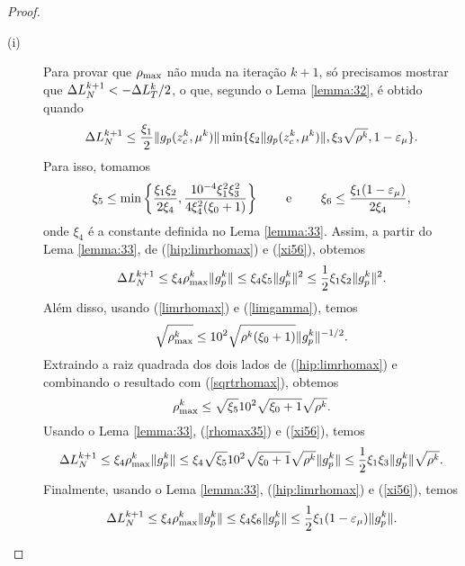 \begin{proof} 
  \begin{description} 
    \item[(i)] Para provar que $\rho_{\max}$ n\~ao muda na itera\c{c}\~ao $k+1$,
      s\'o precisamos mostrar que $\Delta L_N^{k+1} < -\Delta L_T^{k}/2$, o que, segundo o
      Lema \ref{lemma:32}, é obtido quando
  \begin{equation} 
    \DLV{k+1} \leq
    \frac{\xi_1}{2}\norma{g_p(\zc{k},\mu^k)}\min\{\xi_2\norma{g_p(\zc{k},
    \mu^k)},\xi_3\sqrt{\rho^k},1-\epsmu\}.\visiblelbl{eq:DLVlema2}
\end{equation} 
Para isso, tomamos 
\begin{equation} \visiblelbl{xi56}
  \xi_5\leq\min\bigg\{\frac{\xi_1\xi_2}{2\xi_4},\frac{10^{-4}\xi_1^2\xi_3^2}
  {4\xi_4^2(\xi_0+1)}\bigg\} \qquad \mbox{ e } \qquad \xi_6 \leq
  \frac{\xi_1(1-\epsmu)} {2\xi_4}, 
\end{equation} 
onde $\xi_4$ é a constante definida no Lema \ref{lemma:33}. Assim, a partir do Lema
\ref{lemma:33}, de (\ref{hip:limrhomax}) e (\ref{xi56}), obtemos
\begin{equation}\visiblelbl{dlvaux1} 
  \DLV{k+1} \leq \xi_4\rhomax^k\norma{\gpk{k}} \leq
    \xi_4\xi_5\norma{\gpk{k}}^2 \leq \meio\xi_1\xi_2\norma{\gpk{k}}^2.  
\end{equation} 
Além disso, usando (\ref{limrhomax}) e (\ref{limgamma}), temos
\begin{equation}\visiblelbl{sqrtrhomax} 
  \sqrt{\rhomax^k} \leq 10^2\sqrt{\rho^k(\xi_0+1)} \norma{\gpk{k}}^{-1/2}.  
\end{equation}
Extraindo a raiz quadrada dos dois lados de (\ref{hip:limrhomax}) e combinando o
resultado com (\ref{sqrtrhomax}), obtemos
\begin{equation}\visiblelbl{rhomax35} 
  \rhomax^k \leq \sqrt{\xi_5}10^2\sqrt{\xi_0+1}\sqrt{\rho^k}.  
\end{equation} 
  Usando o Lema \ref{lemma:33}, (\ref{rhomax35}) e (\ref{xi56}), temos
\begin{equation}\visiblelbl{dlvaux2} 
  \DLV{k+1} \leq \xi_4\rhomax^k\norma{\gpk{k}} \leq
  \xi_4\sqrt{\xi_5}10^2\sqrt{\xi_0+1}\sqrt{\rho^k}\norma{\gpk{k}} \leq
\meio\xi_1\xi_3\norma{\gpk{k}}\sqrt{\rho^k}. 
\end{equation} 
Finalmente, usando o Lema \ref{lemma:33}, (\ref{hip:limrhomax}) e (\ref{xi56}),
temos 
\begin{equation}\visiblelbl{dlvaux3} 
  \DLV{k+1} \leq \xi_4\rhomax^k\norma{\gpk{k}} \leq \xi_4\xi_6\norma{\gpk{k}}
  \leq \meio\xi_1(1-\epsmu)\norma{\gpk{k}}.  

\end{equation}
\end{description}
\end{proof}
